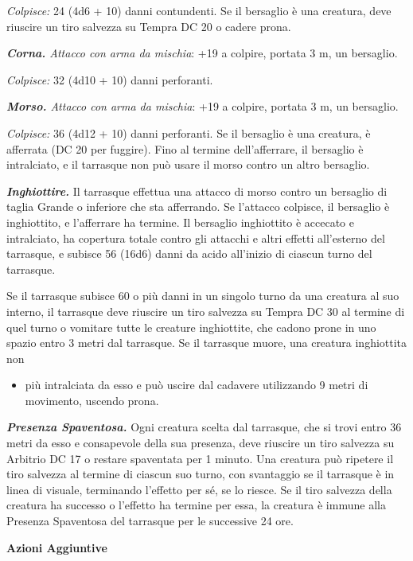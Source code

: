 \begin{multicols}{2}
\emph{Colpisce:} 24 (4d6 + 10) danni contundenti. Se il bersaglio è una
creatura, deve riuscire un tiro salvezza su Tempra DC 20 o cadere prona.

\emph{\textbf{Corna.} Attacco con arma da mischia}: +19 a colpire,
portata 3 m, un bersaglio.

\emph{Colpisce:} 32 (4d10 + 10) danni perforanti.

\emph{\textbf{Morso.} Attacco con arma da mischia}: +19 a colpire,
portata 3 m, un bersaglio.

\emph{Colpisce:} 36 (4d12 + 10) danni perforanti. Se il bersaglio è una
creatura, è afferrata (DC 20 per fuggire). Fino al termine
dell'afferrare, il bersaglio è intralciato, e il tarrasque non può usare
il morso contro un altro bersaglio.

\emph{\textbf{Inghiottire.}} Il tarrasque effettua una attacco di morso
contro un bersaglio di taglia Grande o inferiore che sta afferrando. Se
l'attacco colpisce, il bersaglio è inghiottito, e l'afferrare ha
termine. Il bersaglio inghiottito è accecato e intralciato, ha copertura
totale contro gli attacchi e altri effetti all'esterno del tarrasque, e
subisce 56 (16d6) danni da acido all'inizio di ciascun turno del
tarrasque.

Se il tarrasque subisce 60 o più danni in un singolo turno da una
creatura al suo interno, il tarrasque deve riuscire un tiro salvezza su Tempra DC 30 al termine di quel turno o vomitare tutte le creature
inghiottite, che cadono prone in uno spazio entro 3 metri dal tarrasque.
Se il tarrasque muore, una creatura inghiottita non


\begin{itemize}
\item
  più intralciata da esso e può uscire dal cadavere utilizzando 9 metri
  di movimento, uscendo prona.
\end{itemize}


\emph{\textbf{Presenza Spaventosa.}} Ogni creatura scelta dal tarrasque,
che si trovi entro 36 metri da esso e consapevole della sua presenza,
deve riuscire un tiro salvezza su Arbitrio DC 17 o restare spaventata
per 1 minuto. Una creatura può ripetere il tiro salvezza al termine di
ciascun suo turno, con svantaggio se il tarrasque è in linea di visuale,
terminando l'effetto per sé, se lo riesce. Se il tiro salvezza della
creatura ha successo o l'effetto ha termine per essa, la creatura è
immune alla Presenza Spaventosa del tarrasque per le successive 24 ore.

\textbf{Azioni Aggiuntive}


\end{multicols}
